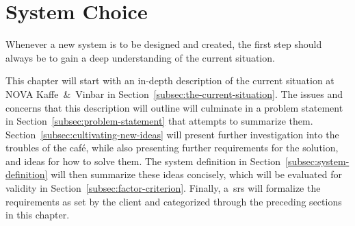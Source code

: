 \section{System Choice}\label{sec:system-choice}

Whenever a new system is to be designed and created, the first step should always be to gain a deep understanding of the
current situation.

This chapter will start with an in-depth description of the current situation at NOVA Kaffe~\&~Vinbar in
Section~\ref{subsec:the-current-situation}.
The issues and concerns that this description will outline will culminate in a problem statement in
Section~\ref{subsec:problem-statement} that attempts to summarize them.
Section~\ref{subsec:cultivating-new-ideas} will present further investigation into the troubles of the
café, while also presenting further requirements for the solution, and ideas for how to solve them.
The system definition in Section~\ref{subsec:system-definition} will then summarize these ideas concisely, which will be
evaluated for validity in Section~\ref{subsec:factor-criterion}.
Finally, a~\acrfull{srs} will formalize the requirements as set by the client and categorized through the preceding
sections in this chapter.







